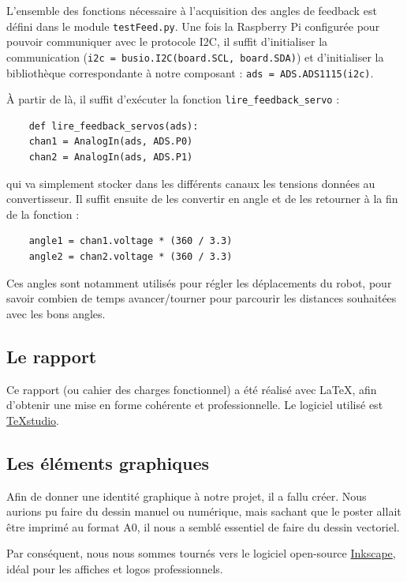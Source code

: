 \documentclass[a4paper,12pt]{report}  %
\begin{document}
L’ensemble des fonctions nécessaire à l’acquisition des angles de feedback est défini dans le module \texttt{testFeed.py}. Une fois la Raspberry Pi configurée pour pouvoir communiquer avec le protocole I2C, il suffit d’initialiser la communication (\texttt{i2c = busio.I2C(board.SCL, board.SDA)}) et d’initialiser la bibliothèque correspondante à notre composant : \texttt{ads = ADS.ADS1115(i2c)}.

À partir de là, il suffit d’exécuter la fonction \texttt{lire\_feedback\_servo} : 

\begin{lstlisting}
	def lire_feedback_servos(ads):
	chan1 = AnalogIn(ads, ADS.P0)
	chan2 = AnalogIn(ads, ADS.P1)
\end{lstlisting}

qui va simplement stocker dans les différents canaux les tensions données au convertisseur. Il suffit ensuite de les convertir en angle et de les retourner à la fin de la fonction :

\begin{lstlisting}
	angle1 = chan1.voltage * (360 / 3.3)
	angle2 = chan2.voltage * (360 / 3.3)
\end{lstlisting}

Ces angles sont notamment utilisés pour régler les déplacements du robot, pour savoir combien de temps avancer/tourner pour parcourir les distances souhaitées avec les bons angles.

\subsection{Le rapport}

Ce rapport (ou cahier des charges fonctionnel) a été réalisé avec \LaTeX, afin d'obtenir une mise en forme cohérente et professionnelle. Le logiciel utilisé est \href{https://flathub.org/apps/org.texstudio.TeXstudio}{TeXstudio}. 

\subsection{Les éléments graphiques}

Afin de donner une identité graphique à notre projet, il a fallu créer. Nous aurions pu faire du dessin manuel ou numérique, mais sachant que le poster allait être imprimé au format A0, il nous a semblé essentiel de faire du dessin vectoriel. 

Par conséquent, nous nous sommes tournés vers le logiciel open-source \href{https://flathub.org/apps/org.inkscape.Inkscape}{Inkscape}, idéal pour les affiches et logos professionnels. 
\end{document}
